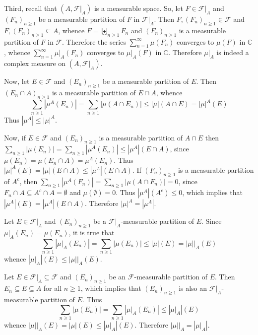 \documentclass[a4paper]{article}
\newcommand{\brac}[1]{\left ( #1 \right )}
\newcommand{\induc}[1]{\left . #1 \right \vert}
\newcommand{\abs}[1]{\left | #1 \right |}
\newcommand{\Cplx}{\mathbb{C}}
\newcommand{\Fcal}{\mathcal{F}}
\begin{document}
Third, recall that $\brac{A, \induc{\Fcal}_A}$ is a measurable space. So, let $F\in \induc{\Fcal}_A$ and $\brac{F_n}_{n\geq1}$ be a measurable partition of $F$ in $\induc{\Fcal}_A$. Then $F, \brac{F_n}_{n\geq1}\in \Fcal$ and $F, \brac{F_n}_{n\geq1}\subseteq A$, whence $F=\biguplus_{n\geq1} F_n$ and $\brac{F_n}_{n\geq1}$ is a measurable partition of $F$ in $\Fcal$. Therefore the series $\sum_{n=1}^\infty \mu\brac{F_n}$ converges to $\mu\brac{F}$ in $\Cplx$, whence $\sum_{n=1}^\infty \induc{\mu}_A\brac{F_n}$ converges to $\induc{\mu}_A\brac{F}$ in $\Cplx$. Therefore $\induc{\mu}_A$ is indeed a complex measure on $\brac{A, \induc{\Fcal}_A}$.

Now, let $E\in \Fcal$ and $\brac{E_n}_{n\geq1}$ be a measurable partition of $E$. Then $\brac{E_n\cap A}_{n\geq1}$ is a measurable partition of $E\cap A$, whence \[\sum_{n\geq1} \abs{\mu^A\brac{E_n}} = \sum_{n\geq1} \abs{\mu\brac{A\cap E_n}} \leq \abs{\mu}\brac{A\cap E} = \abs{\mu}^A\brac{E}\] Thus $\abs{\mu^A}\leq \abs{\mu}^A$.

Now, if $E\in \Fcal$ and $\brac{E_n}_{n\geq1}$ is a measurable partition of $A\cap E$ then $\sum_{n\geq1} \abs{\mu\brac{E_n}} = \sum_{n\geq1}\abs{\mu^A\brac{E_n}}\leq \abs{\mu^A}\brac{E\cap A}$, since $\mu\brac{E_n}=\mu\brac{E_n\cap A}=\mu^A\brac{E_n}$. Thus $\abs{\mu}^A\brac{E} = \abs{\mu}\brac{E\cap A}\leq \abs{\mu^A}\brac{E\cap A}$. If $\brac{F_n}_{n\geq1}$ is a measurable partition of $A^c$, then $\sum_{n\geq1}\abs{\mu^A\brac{F_n}} = \sum_{n\geq1}\abs{\mu\brac{A\cap F_n}} = 0$, since $F_n \cap A \subseteq A^c \cap A = \emptyset$ and $\mu\brac{\emptyset}=0$. Thus $\abs{\mu^A}\brac{A^c}\leq 0$, which implies that $\abs{\mu^A}\brac{E} = \abs{\mu^A}\brac{E\cap A}$. Therefore $\abs{\mu}^A = \abs{\mu^A}$.

Let $E\in \induc{\Fcal}_A$ and $\brac{E_n}_{n\geq1}$ be a $\induc{\Fcal}_A$-measurable partition of $E$. Since $\induc{\mu}_A\brac{E_n} = \mu\brac{E_n}$, it is true that \[\sum_{n\geq1}\abs{\induc{\mu}_A\brac{E_n}} = \sum_{n\geq1}\abs{\mu\brac{E_n}}\leq \abs{\mu}\brac{E} = \induc{\abs{\mu}}_A\brac{E}\] whence $\abs{\induc{\mu}_A}\brac{E}\leq \induc{\abs{\mu}}_A\brac{E}$.

Let $E\in \induc{\Fcal}_A\subseteq \Fcal$ and $\brac{E_n}_{n\geq1}$ be an $\Fcal$-measurable partition of $E$. Then $E_n\subseteq E\subseteq A$ for all $n\geq1$, which implies that $\brac{E_n}_{n\geq1}$ is also an $\induc{\Fcal}_A$-measurable partition of $E$. Thus \[\sum_{n\geq1} \abs{\mu\brac{E_n}} = \sum_{n\geq1} \abs{\induc{\mu}_A\brac{E_n}} \leq \abs{\induc{\mu}_A}\brac{E} \] whence $\induc{\abs{\mu}}_A\brac{E} = \abs{\mu}\brac{E}\leq \abs{\induc{\mu}_A}\brac{E}$. Therefore $\induc{\abs{\mu}}_A = \abs{\induc{\mu}_A}$.
\end{document}
